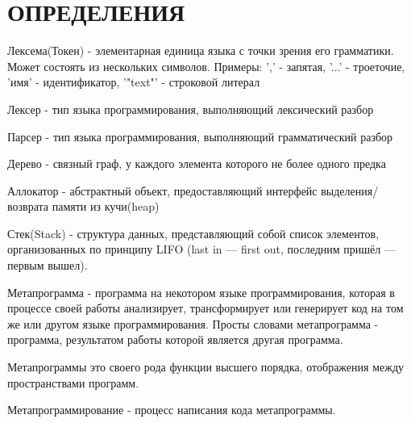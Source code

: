\chapter*{ОПРЕДЕЛЕНИЯ}             %

\ifdefined \acrstyle \else
    \newcommand{\acrstyle}[1]{#1}
\fi


\acrstyle{Лексема(Токен)} - элементарная единица языка с точки зрения его грамматики. Может состоять из нескольких символов.
Примеры: ',' - запятая, '...' - троеточие, 'имя' - идентификатор, '"text"' - строковой литерал

\acrstyle{Лексер} - тип языка программирования, выполняющий лексический разбор

\acrstyle{Парсер} - тип языка программирования, выполняющий грамматический разбор


\acrstyle{Дерево} - связный граф, у каждого элемента которого не более одного предка

\acrstyle{Аллокатор} - абстрактный объект, предоставляющий интерфейс выделения/возврата памяти из кучи(heap)

\acrstyle{Стек(Stack)} -  структура данных, представляющий собой список элементов, организованных по принципу LIFO (last in — first out, последним пришёл — первым вышел).

\acrstyle{Метапрограмма} - программа на некотором языке программирования, которая в процессе своей работы анализирует, трансформирует или генерирует код на том же или другом языке программирования.
Просты словами метапрограмма - программа, результатом работы которой является другая программа.

\acrstyle{Метапрограммы} это своего рода функции высшего порядка\cite{wiki-hof}, отображения между пространствами программ.

\acrstyle{Метапрограммирование} - процесс написания кода метапрограммы.